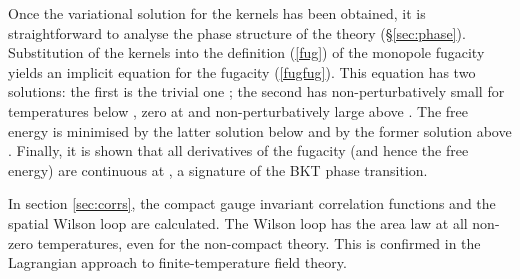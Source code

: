 \documentclass[a4paper,a4paper]{article}
\begin{document}
Once the variational solution for the kernels has been obtained, 
it is straightforward to analyse the phase structure of the theory (\S\ref{sec:phase}).
Substitution of the kernels into the definition (\ref{fug}) of the monopole fugacity \coordHE{} yields an implicit equation for
the fugacity (\ref{fugfug}). This equation has two solutions: the first is the trivial one \coordHE{}; 
the second has \coordHE{} non-perturbatively small for temperatures below \coordHE{}, zero at \coordHE{} and non-perturbatively large above \coordHE{}.
The free energy is minimised by the latter solution below \coordHE{} and by the former solution above \coordHE{}. Finally, it is
shown that all derivatives of the fugacity (and hence the free energy) are continuous at \coordHE{}, a signature of the BKT phase transition.

In section \ref{sec:corrs}, the compact gauge invariant correlation functions and the spatial Wilson loop are calculated.
The Wilson loop has the area law at all non-zero temperatures, even for the non-compact theory.
This is confirmed in the Lagrangian approach to finite-temperature field theory.
%
%
%
%
%
%
\end{document}
